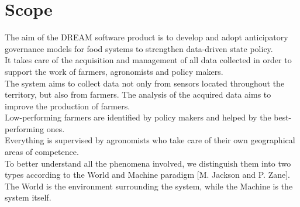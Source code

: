\section{Scope}

The aim of the DREAM software product is to develop and adopt anticipatory governance models for food systems to strengthen data-driven state policy. \\
It takes care of the acquisition and management of all data collected in order to support the work of farmers, agronomists and policy makers.\\
The system aims to collect data not only from sensors located throughout the territory, but also from farmers. The analysis of the acquired data aims to improve the production of farmers.\\ Low-performing farmers are identified by policy makers and helped by the best-performing ones.\\
Everything is supervised by agronomists who take care of their own geographical areas of competence.\\

To better understand all the phenomena involved, we distinguish them into two types according to the World and Machine paradigm [M. Jackson and P. Zane]. The World is the environment surrounding the system, while the Machine is the system itself.

